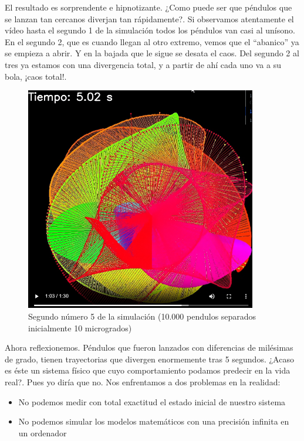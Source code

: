 \documentclass[
  10pt,
  a4paper,
  DIV=11,
  numbers=noendperiod,
  open=any]{scrreprt}
\providecommand{\tightlist}{%
  \setlength{\itemsep}{0pt}\setlength{\parskip}{0pt}}
\numberwithin{equation}{chapter}
\numberwithin{equation}{section}
\renewcommand{\[}{\begin{equation}}
\renewcommand{\]}{\end{equation}}
\begin{document}
El resultado es sorprendente e hipnotizante. ¿Como puede ser que
péndulos que se lanzan tan cercanos diverjan tan rápidamente?. Si
observamos atentamente el vídeo hasta el segundo 1 de la simulación
todos los péndulos van casi al unísono. En el segundo 2, que es cuando
llegan al otro extremo, vemos que el ``abanico'' ya se empieza a abrir.
Y en la bajada que le sigue se desata el caos. Del segundo 2 al tres ya
estamos con una divergencia total, y a partir de ahí cada uno va a su
bola, ¡caos total!.

\begin{figure}[h]
  \centering
  \includegraphics[width=0.9\textwidth]{02-pendulo-doble/abanico.png}
  \caption{Segundo número 5 de la simulación (10.000 pendulos separados inicialmente 10 microgrados)}
\end{figure}

Ahora reflexionemos. Péndulos que fueron lanzados con diferencias de
milésimas de grado, tienen trayectorias que divergen enormemente tras 5
segundos. ¿Acaso es éste un sistema físico que cuyo comportamiento
podamos predecir en la vida real?. Pues yo diría que no. Nos enfrentamos a dos problemas en la realidad:

\begin{itemize}
\tightlist
\item
  No podemos medir con total exactitud el estado inicial de nuestro
  sistema
\item
  No podemos simular los modelos matemáticos con una precisión infinita
  en un ordenador
\end{itemize}
\end{document}
